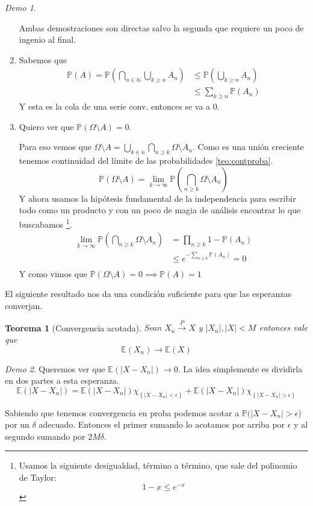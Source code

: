 \documentclass[11pt]{article}
\theoremstyle{plain} %
\newtheorem{teorema}{Teorema}
\theoremstyle{definition}
\theoremstyle{remark}
\newtheorem*{demo}{Demo}
\def\Om{\Omega}
\def\E{\mathbb{E}}
\def\N{\mathbb{N}}
\def\P{\mathbb{P}}
\renewcommand\qed{\ding{110}}
\newcommand{\proba}{\overset{P}{\to}}
\begin{document}
\begin{demo}
	\begin{enumerate}
		Ambas demostraciones son directas salvo la segunda que requiere un poco de ingenio al final.
		\item Sabemos que 
		\begin{align*}
			\P (A) = \P (\bigcap_{n \in \N} \bigcup_{k \geq n} A_n) &\leq \P(\bigcup_{k \geq n} A_n) \\
			&\leq \sum_{k \geq n} \P(A_n)
		\end{align*}
Y esta es la cola de una serie conv. entonces se va a 0.

		\item Quiero ver que $\P(\Om \setminus A) = 0$.
		
		Para eso vemos que $\Om \setminus A =  \bigcup_{k \in n} \bigcap_{n \geq k} \Om \setminus A_n$. Como es una unión creciente tenemos continuidad del límite de las probabilidades \ref{teo:contproba}.
		\[ \P\left( \Om \setminus A \right)  = \lim_{k \to \infty} \P (\bigcap_{n \geq k} \Om \setminus A_n)  \]
		Y ahora usamos la hipótesis fundamental de la independencia para escribir todo como un producto y con un poco de magia de análisis encontrar lo que buscabamos \footnote{Usamos la siguiente desigualdad, término a término, que sale del polinomio de Taylor: $$1-x \leq e^{-x}$$}.
		\begin{align*}
			\lim_{k \to \infty} \P (\bigcap_{n \geq k} \Om \setminus A_n) &=\prod_{n \geq k} 1 - \P(A_n) \\
			& \leq e^{-\sum_{n \geq k} \P(A_n)}  = 0 \\
		\end{align*}
		Y como vimos que $\P(\Om \setminus A) = 0 \implies \P(A)=1$ \qed
	\end{enumerate}
\end{demo}

El siguiente resultado nos da una  condición suficiente para que las esperanzas converjan.

\begin{teorema}
	[Convergencia acotada]
	Sean $X_n \proba X$ y $|X_n|,|X| < M$ entonces vale que
	\[ \E(X_n) \to \E(X) \]
\end{teorema}

\begin{demo}	
	Queremos ver que $\E(|X-X_n|) \to 0$. La idea simplemente es dividirla en dos partes a esta esperanza. 
	\[\E(|X-X_n|) = \E(|X-X_n|)\chi_{\left\lbrace |X-X_n|<\epsilon\right\rbrace } + \E(|X-X_n|)\chi_{\left\lbrace |X-X_n|>\epsilon\right\rbrace }\]
	
	Sabiendo que tenemos convergencia en proba podemos acotar a $\P(|X-X_n|>\epsilon$) por un $\delta$ adecuado. Entonces el primer sumando lo acotamos por arriba por $\epsilon$ y al segundo sumando por  $2M\delta$. \qed
\end{demo}
\end{document}
